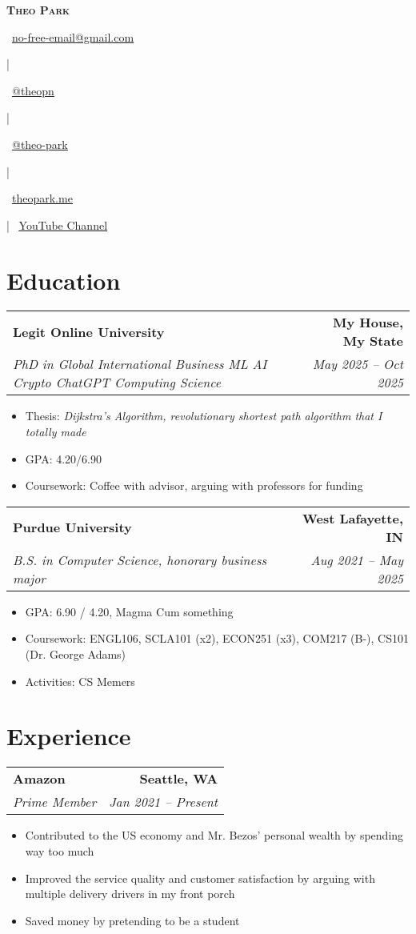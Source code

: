 \documentclass[letterpaper,11pt]{article} %
\makeatletter
\newcommand{\bigname}[1]{
  \textbf{\Huge \scshape #1} \\ \vspace*{0.5em}
}
\newcommand{\email}[1]{
  \raisebox{-0.2\height}\faEnvelope\
  \href{mailto:#1}{\underline{#1}} \nobreakspace{}
}
\newcommand{\website}[1]{
  \raisebox{-0.2\height}\faLink\
  \href{https://#1}{\underline{#1}} ~
}
\newcommand{\github}[1]{
  \raisebox{-0.2\height}\faGithub\
  \href{https://github.com/#1}{\underline{@#1}} ~
}
\newcommand{\linkedin}[1]{
  \raisebox{-0.2\height}\faLinkedinSquare\
  \href{https://linkedin.com/in/#1}{\underline{@#1}} ~
}
\newcommand{\fourItems}[4]{
  \begin{tabular*}{1.0\textwidth}[t]{l@{\extracolsep{\fill}}r}
    \textbf{\large #1} & \textbf{\small #2} \\
    \textit{\large #3} & \textit{\small #4} \\
  \end{tabular*}

  \vspace*{-0.5em}
}
\newenvironment{tightItemize}
  {\begin{itemize}[itemsep=-0.3em]}
  {\end{itemize}\vspace*{-0.5em}}
\makeatother
\begin{document}
\thispagestyle{empty} %


  \bigname{Theo Park}
  \email{no-free-email@gmail.com}
  |
  \github{theopn}
  |
  \linkedin{theo-park}
  |
  \website{theopark.me}
  |
  \raisebox{-0.2\height}\faYoutube\
  \href{https://youtu.be/dQw4w9WgXcQ}{\underline{YouTube Channel}} ~


\section{Education}

\fourItems{Legit Online University}{My House, My State}
          {PhD in Global International Business ML AI Crypto ChatGPT Computing Science}{May 2025 -- Oct 2025}
\begin{tightItemize}
  \item Thesis: \textit{Dijkstra's Algorithm, revolutionary shortest path algorithm that I totally made}
  \item GPA: 4.20/6.90
  \item Coursework: Coffee with advisor, arguing with professors for funding
\end{tightItemize}

\fourItems{Purdue University}{West Lafayette, IN}
          {B.S. in Computer Science, honorary business major}{Aug 2021 -- May 2025}
\begin{tightItemize}
  \item GPA: 6.90 / 4.20, Magma Cum something
  \item Coursework: ENGL106, SCLA101 (x2), ECON251 (x3), COM217 (B-), CS101 (Dr. George Adams)
  \item Activities: CS Memers
\end{tightItemize}


\section{Experience}

\fourItems{Amazon}{Seattle, WA}
{Prime Member}{Jan 2021 -- Present}
\begin{tightItemize}
  \item Contributed to the US economy and Mr. Bezos' personal wealth by spending way too much
  \item Improved the service quality and customer satisfaction by arguing with multiple delivery drivers in my front porch
  \item Saved money by pretending to be a student
\end{tightItemize}
\end{document}

